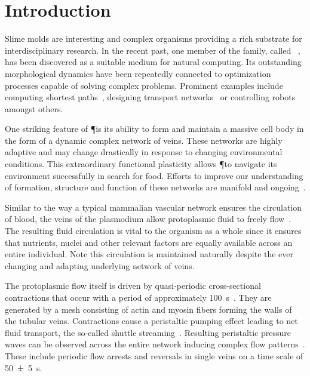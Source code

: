 
\section{Introduction}

  Slime molds are interesting and complex organisms providing a rich substrate for interdisciplinary research. In the recent past, one member of the family, called \Pp~\cite{lifecycle}, has been discovered as a suitable medium for natural computing. Its outstanding morphological dynamics have been repeatedly connected to optimization processes capable of solving complex problems. Prominent examples include computing shortest paths~\cite{nakagaki2000intelligence,Tero2006115,bonifaci2012physarum}, designing transport networks~\cite{tero2010rules,nakagaki2007minimum} or controlling robots~\cite{tsuda2004robust} amongst others. 

  One striking feature of \P is its ability to form and maintain a massive cell body in the form of a dynamic complex network of veins. These networks are highly adaptive and may change drastically in response to changing environmental conditions. This extraordinary functional plasticity allows \P to navigate its environment successfully in search for food. Efforts to improve our understanding of formation, structure and function of these networks are manifold and ongoing~\cite{Marwan419,tero2010rules,alim2013random,baumgarten2010plasmodial,baumgarten2013functional}.

  Similar to the way a typical mammalian vascular network ensures the circulation of blood, the veins of the plasmodium allow protoplasmic fluid to freely flow~\cite{kamiya1958studies}. The resulting fluid circulation is vital to the organism as a whole since it ensures that nutrients, nuclei and other relevant factors are equally available across an entire individual. Note this circulation is maintained naturally despite the ever changing and adapting underlying network of veins. 

  The protoplasmic flow itself is driven by quasi-periodic cross-sectional contractions that occur with a period of approximately \SI{100}{\second}~\cite{stewart1959protoplasmic,Wohlfarth-Bottermann15}. They are generated by a mesh consisting of actin and myosin fibers forming the walls of the tubular veins. Contractions cause a peristaltic pumping effect leading to net fluid transport, the so-called shuttle streaming~\cite{kamiya1959motive}. Resulting peristaltic pressure waves can be observed across the entire network inducing complex flow patterns~\cite{nakagaki2000interaction}. These include periodic flow arrests and reversals in single veins on a time scale of \SI{50 \pm 5}{\second}. 


